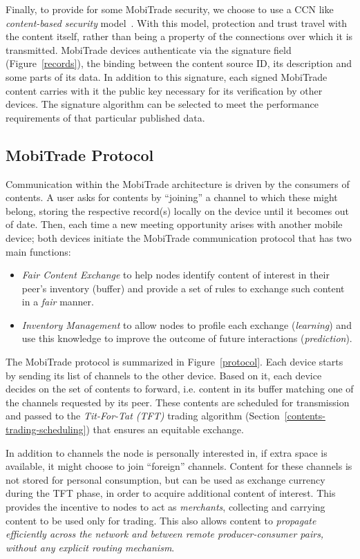 Finally, to provide for some MobiTrade security, we choose to use a CCN like \emph{content-based security} model~\cite{CCN}. With this model, protection and trust travel with the content itself, rather than being a property of the connections over which it is transmitted.
MobiTrade devices authenticate via the signature field (Figure~\ref{records}), the binding between the content source ID, its description and some parts of its data. In addition to this signature, each signed MobiTrade content carries with it the public key necessary for its verification by other devices. The signature algorithm can be selected to meet the performance requirements of that particular published data.

\subsection{MobiTrade Protocol}
\label{communication-protocol}
Communication within the MobiTrade architecture is driven by the consumers of contents. A user asks for contents by ``joining'' a channel to which these might belong, storing the respective record(s) locally on the device until it becomes out of date. Then, each time a new meeting opportunity arises with another mobile device; both devices initiate the MobiTrade communication protocol that has two main functions:
\begin{itemize}
\item \emph{Fair Content Exchange} to help nodes identify content of interest in their peer's inventory (buffer) and provide a set of rules to exchange such content in a \emph{fair} manner.
\item \emph{Inventory Management} to allow nodes to profile each exchange (\emph{learning}) and use this knowledge to improve the outcome of future interactions (\emph{prediction}).
\end{itemize}

The MobiTrade protocol is summarized in Figure~\ref{protocol}. Each device starts by sending its list of channels to the other device. Based on it, each device decides on the set of contents to forward, i.e. content in its buffer matching one of the channels requested by its peer. These contents are scheduled for transmission and passed to the \emph{Tit-For-Tat (TFT)} trading algorithm (Section~\ref{contents-trading-scheduling}) that ensures an equitable exchange.

In addition to channels the node is personally interested in, if extra space is available, it might choose to join ``foreign'' channels. Content for these channels is not stored for personal consumption, but can be used as exchange currency during the TFT phase, in order to acquire additional content of interest. This provides the incentive to nodes to act as \emph{merchants}, collecting and carrying content to be used only for trading. This also allows content to \emph{propagate efficiently across the network and between remote producer-consumer pairs, without any explicit routing mechanism}. %

